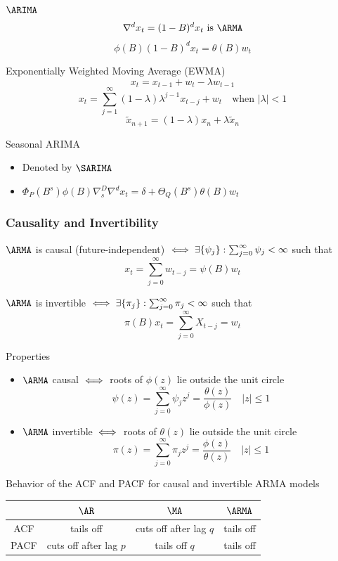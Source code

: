 \documentclass[landscape]{article}
\newenvironment{titemize}[1]{
  \begin{minipage}[h]{\columnwidth}
    #1
    \begin{itemize}
}{
    \end{itemize}
  \end{minipage}
}
\begin{document}
\begin{multicols*}{2}
$\ARIMA$
\[\nabla^d x_t = (1-B)^d x_t \text{ is } \ARMA\]
\[\phi(B)(1-B)^d x_t = \theta(B) w_t\]

Exponentially Weighted Moving Average (EWMA)
\[x_t = x_{t-1} + w_t - \lambda w_{t-1}\]
\[x_t = \sum_{j=1}^\infty(1-\lambda)\lambda^{j-1} x_{t-j} + w_t
\quad\text{when } |\lambda| < 1\]
\[\tilde{x}_{n+1} = (1-\lambda)x_n + \lambda \tilde{x}_n\]

\begin{titemize}{Seasonal ARIMA}
  \item Denoted by $\SARIMA$
  \item $\Phi_P(B^s) \phi(B) \nabla_s^D \nabla^d x_t
    = \delta + \Theta_Q(B^s)\theta(B)w_t$
\end{titemize}

\subsubsection{Causality and Invertibility}
$\ARMA$ is causal (future-independent)
$\;\Longleftrightarrow\; \exists \{\psi_j\} : \sum_{j=0}^\infty \psi_j < \infty$ such that
\[x_t = \sum_{j=0}^\infty w_{t-j} = \psi(B)w_t\]

$\ARMA$ is invertible
$\;\Longleftrightarrow\; \exists \{\pi_j\} : \sum_{j=0}^\infty \pi_j < \infty$ such that
\[\pi(B)x_t = \sum_{j=0}^\infty X_{t-j} = w_t\]

Properties
\begin{itemize}
  \item $\ARMA$ causal $\;\Longleftrightarrow\;$
    roots of $\phi(z)$ lie outside the unit circle
    \[\psi(z) = \sum_{j=0}^\infty\psi_j z^j = \frac{\theta(z)}{\phi(z)}
    \quad |z| \le 1\]
  \item $\ARMA$ invertible $\;\Longleftrightarrow\;$
    roots of $\theta(z)$ lie outside the unit circle
    \[\pi(z) = \sum_{j=0}^\infty\pi_j z^j = \frac{\phi(z)}{\theta(z)}
    \quad |z| \le 1\]
\end{itemize}

Behavior of the ACF and PACF for causal and invertible ARMA models

\begin{center}
  \begin{tabular}{|c|ccc|}
    \hline
    & $\AR$ & $\MA$ & $\ARMA$\\
    \hline
    ACF & tails off & cuts off after lag $q$ & tails off \\
    PACF & cuts off after lag $p$ & tails off $q$ & tails off \\
    \hline
  \end{tabular}
\end{center}


\end{multicols*}
\end{document}
